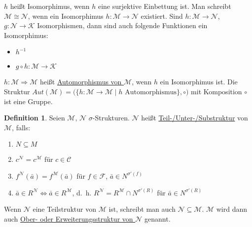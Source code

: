 \documentclass{article}
\theoremstyle{definition}
\newtheorem{dfn}{Definition}
\newcommand{\calC}{\mathcal{C}}
\newcommand{\calF}{\mathcal{F}}
\newcommand{\calK}{\mathcal{K}}
\newcommand{\calM}{\mathcal{M}}
\newcommand{\calN}{\mathcal{N}}
\begin{document}
    $ h $ heißt Isomorphimus, wenn $ h $ eine surjektive Einbettung ist.
    Man schreibt $ \calM \cong \calN $, wenn ein Isomorphimus $ h : \calM \rightarrow \calN $ existiert.
    Sind $ h : \calM \rightarrow \calN $, $ g : \calN \rightarrow \calK $ Isomorphismen, dann sind auch folgende Funktionen ein Isomorphimus:
    \begin{itemize}
        \item $ h^{-1} $
        \item $ g \circ h : \calM \rightarrow \calK $
    \end{itemize}

    $ h : \calM \Rightarrow \calM $ heißt \underline{Automorphismus von $ \calM $}, wenn $ h $ ein Isomorphimus ist.
    Die Struktur $ Aut(\calM) = \big( \{ h : \calM \rightarrow \calM \mid h \text{ Automorphismus} \}, \circ \big) $ mit Komposition $ \circ $ ist eine Gruppe.

    \begin{dfn}
        Seien $ \calM $, $ \calN $ $\sigma $-Strukturen.
        $ \calN $ heißt \underline{Teil-/Unter-/Substruktur} von $ \calM $, falls:
        \begin{enumerate}
            \item $ N \subseteq M $
            \item $ c^\calN = c^\calM $ für $ c \in \calC $
            \item $ f^\calN(\bar{a}) = f^\calM(\bar{a}) $ für $ f \in \calF $, $ \bar{a} \in N^{\sigma'(f)} $
            \item $ \bar{a} \in R^\calN \Leftrightarrow \bar{a} \in R^\calM $, d.~h. $ R^\calN = R^\calM \cap N^{\sigma'(R)} $ für $ \bar{a} \in N^{\sigma'(R)} $
        \end{enumerate}
    \end{dfn}

    Wenn $ \calN $ eine Teilstruktur von $ \calM $ ist, schreibt man auch $ \calN \subseteq \calM $.
    $ \calM $ wird dann auch \underline{Ober- oder Erweiterungsstruktur von $ \calN $} genannt.
\end{document}
